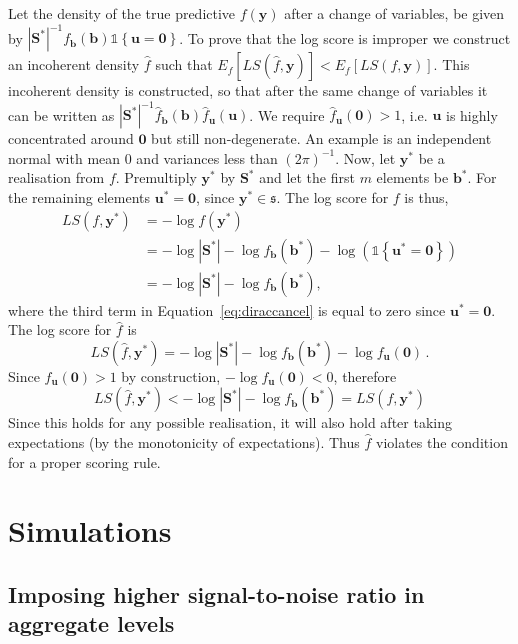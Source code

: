 \documentclass[12pt]{article}
\theoremstyle{definition}
\begin{document}
Let the density of the true predictive $f(\bm{y})$ after a change of variables, be given by $|\bm{S^*}|^{-1}f_{\bm b}(\bm{b})\mathbb{1}\left\{\bm{u}=\bm{0}\right\}$.  To prove that the log score is improper we construct an incoherent density $\hat{f}$ such that $E_f\left[LS\left(\hat{f},\bm{y}\right)\right]<E_f\left[LS\left(f,\bm{y}\right)\right]$. This incoherent density is constructed, so that after the same change of variables it can be written as $|\bm{S^*}|^{-1}\hat{f}_{\bm b}(\bm{b})\hat{f}_{\bm{u}}(\bm{u})$. We require $\hat{f}_{\bm u}(\bm{0})>1$, i.e. ${\bm u}$ is highly concentrated around $\bm{0}$ but still non-degenerate. An example is an independent normal with mean 0 and variances less than $(2\pi)^{-1}$. Now, let $\bm{y}^*$ be a realisation from $f$. Premultiply $\bm{y}^*$ by $\bm{S}^*$ and let the first $m$ elements be $\bm{b^*}$.  For the remaining elements ${\bm u}^*={\bm 0}$, since $\bm{y}^*\in\mathfrak{s}$.  The log score for $f$ is thus,	
\begin{align}
LS\left(f,\bm{y}^*\right) &= -\log f(\bm{y}^*) \nonumber\\
&=-\log|\bm{S^*}|-\log f_{\bm{b}}\left(\bm{b}^*\right)-\log\left(\mathbb{1}\left\{\bm{u}^*=\bm{0}\right\}\right)\label{eq:diraccancel}\\
&=-\log|\bm{S^*}|-\log f_{\bm{b}}\left(\bm{b}^*\right),\nonumber
\end{align}
where the third term in Equation~\ref{eq:diraccancel} is equal to zero since $\bm{u}^*=\bm{0}$.  The log score for $\hat{f}$ is
\[
LS\left(\hat{f},\bm{y}^*\right) = -\log|\bm{S^*}|-\log f_{\bm{b}}(\bm{b}^*)- \log f_{\bm u}(\bm{0})\,.
\]
Since $f_{\bm u}(\bm{0})>1$ by construction, $-\log f_{\bm u}(\bm{0})<0$, therefore
\[
LS\left(\hat{f},\bm{y}^*\right) <-\log|\bm{S^*}|-\log f_{\bm b}(\bm{b}^*)=LS\left(f,\bm{y}^*\right)
\]
Since this holds for any possible realisation, it will also hold after taking expectations (by the monotonicity of expectations).  Thus $\hat{f}$ violates the condition for a proper scoring rule.



\section{Simulations}

\subsection{Imposing higher signal-to-noise ratio in aggregate levels}\label{Append:sig-to-noise}
\end{document}
